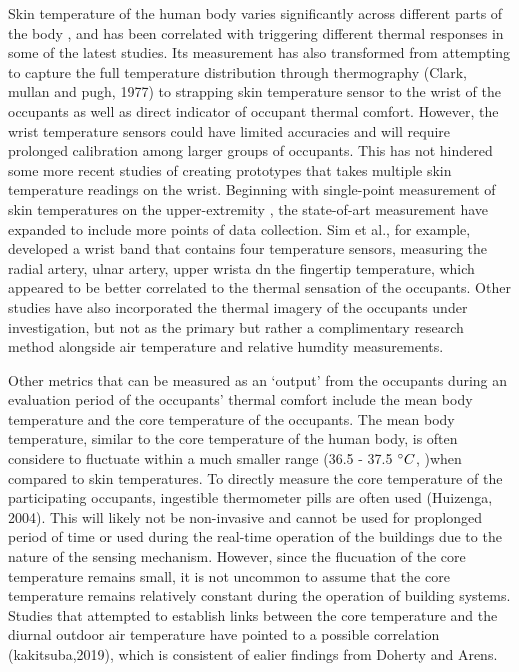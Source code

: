 	Skin temperature of the human body varies significantly across different parts of the body \cite{choi_cobi:_2010}, and has been correlated with triggering different thermal responses in some of the latest studies. Its measurement has also transformed from attempting to capture the full temperature distribution through thermography (Clark, mullan and pugh, 1977) to strapping skin temperature sensor to the wrist of the occupants \cite{choi_investigation_2017,liu_personal_2019} as well as direct indicator of occupant thermal comfort. However, the wrist temperature sensors could have limited accuracies \cite{mccarthy_validation_2016} and will require prolonged calibration among larger groups of occupants. This has not hindered some more recent studies of creating prototypes that takes multiple skin temperature readings on the wrist. Beginning with single-point measurement of skin temperatures on the upper-extremity \cite{wang_observations_2007}, the state-of-art measurement have expanded to include more points of data collection. Sim et al., for example, developed a wrist band that contains four temperature sensors, measuring the radial artery, ulnar artery, upper wrista dn the fingertip temperature, which appeared to be better correlated to the thermal sensation of the occupants. Other studies have also incorporated the thermal imagery of the occupants under investigation, but not as the primary but rather a complimentary research method alongside air temperature and relative humdity measurements\cite{lu_thermal_2019}. 

	Other metrics that can be measured as an `output' from the occupants during an evaluation period of the occupants' thermal comfort include the mean body temperature and the core temperature of the occupants. The mean body temperature, similar to the core temperature of the human body, is often considere to fluctuate within a much smaller range (36.5 - 37.5 $\degree C$, \cite{shapiro_environmental_1984})when compared to skin temperatures. To directly measure the core temperature of the participating occupants, ingestible thermometer pills are often used (Huizenga, 2004). This will likely not be non-invasive and cannot be used for proplonged period of time or used during the real-time operation of the buildings due to the nature of the sensing mechanism. However, since the flucuation of the core temperature remains small, it is not uncommon to assume that the core temperature remains relatively constant during the operation of building systems\cite{gagge_effective_1971}. Studies that attempted to establish links between the core temperature and the diurnal outdoor air temperature have pointed to a possible correlation (kakitsuba,2019), which is consistent of ealier findings from Doherty and Arens\cite{doherty_evaluation_1988}.

